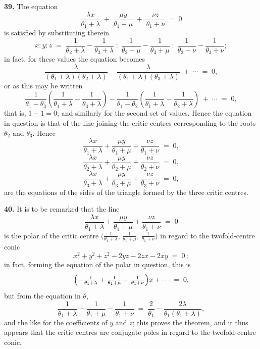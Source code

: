 \documentclass[11pt,a4paper]{article}
\begin{document}
\textbf{39.} The equation
\[
\frac{\lambda x}{\theta_{1}+\lambda} \;+\; \frac{\mu y}{\theta_{1}+\mu} \;+\; \frac{\nu z}{\theta_{1}+\nu} \;=\; 0
\]
is satisfied by substituting therein
\[
x : y : z \;=\; \frac{1}{\theta_{2}+\lambda} - \frac{1}{\theta_{3}+\lambda} \;:\; \frac{1}{\theta_{2}+\mu} - \frac{1}{\theta_{3}+\mu} \;:\; \frac{1}{\theta_{2}+\nu} - \frac{1}{\theta_{3}+\nu};
\]
in fact, for these values the equation becomes
\[
\frac{\lambda}{(\theta_{1}+\lambda)(\theta_{2}+\lambda)} - \frac{\lambda}{(\theta_{1}+\lambda)(\theta_{3}+\lambda)} \;+\; \cdots \;=\; 0,
\]
or as this may be written
\[
\frac{1}{\theta_{1}-\theta_{3}}\!\left(\frac{1}{\theta_{1}+\lambda}-\frac{1}{\theta_{3}+\lambda}\right) - \frac{1}{\theta_{1}-\theta_{2}}\!\left(\frac{1}{\theta_{1}+\lambda}-\frac{1}{\theta_{2}+\lambda}\right) \;+\; \cdots \;=\; 0,
\]
that is, $1-1=0$; and similarly for the second set of values. Hence the equation in question is that of the line joining the critic centres corresponding to the roots $\theta_{2}$ and $\theta_{3}$. Hence
\[
\frac{\lambda x}{\theta_{1}+\lambda} + \frac{\mu y}{\theta_{1}+\mu} + \frac{\nu z}{\theta_{1}+\nu} \;=\; 0,
\]
\[
\frac{\lambda x}{\theta_{2}+\lambda} + \frac{\mu y}{\theta_{2}+\mu} + \frac{\nu z}{\theta_{2}+\nu} \;=\; 0,
\]
\[
\frac{\lambda x}{\theta_{3}+\lambda} + \frac{\mu y}{\theta_{3}+\mu} + \frac{\nu z}{\theta_{3}+\nu} \;=\; 0,
\]
are the equations of the sides of the triangle formed by the three critic centres.

\medskip

\textbf{40.} It is to be remarked that the line
\[
\frac{\lambda x}{\theta_{1}+\lambda} + \frac{\mu y}{\theta_{1}+\mu} + \frac{\nu z}{\theta_{1}+\nu} \;=\; 0
\]
is the polar of the critic centre $\bigl(\tfrac{1}{\theta_{1}+\lambda},\,\tfrac{1}{\theta_{1}+\mu},\,\tfrac{1}{\theta_{1}+\nu}\bigr)$ in regard to the twofold-centre conic
\[
x^{2} + y^{2} + z^{2} - 2yz - 2zx - 2xy \;=\; 0\,;
\]
in fact, forming the equation of the polar in question, this is
\[
\Bigl(-\tfrac{1}{\theta_{1}+\lambda}+\tfrac{1}{\theta_{1}+\mu}+\tfrac{1}{\theta_{1}+\nu}\Bigr)x + \cdots \;=\; 0,
\]
but from the equation in $\theta$,
\[
\frac{1}{\theta_{1}+\lambda} - \frac{1}{\theta_{1}+\mu} - \frac{1}{\theta_{1}+\nu} \;=\; \frac{2}{\theta_{1}} - \frac{2\lambda}{\theta_{1}(\theta_{1}+\lambda)},
\]
and the like for the coefficients of $y$ and $z$; this proves the theorem, and it thus appears that the critic centres are conjugate poles in regard to the twofold-centre conic.

\medskip
\end{document}
